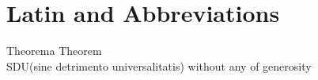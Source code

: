 \documentclass[../note.tex]{subfiles}
\begin{document}
\renewcommand{\thechapter}{\Roman{chapter}}
\chapter{Latin and Abbreviations}
Theorema \hfill  Theorem\\
SDU(sine detrimento universalitatis) \hfill without any of generosity\\
\end{document}
